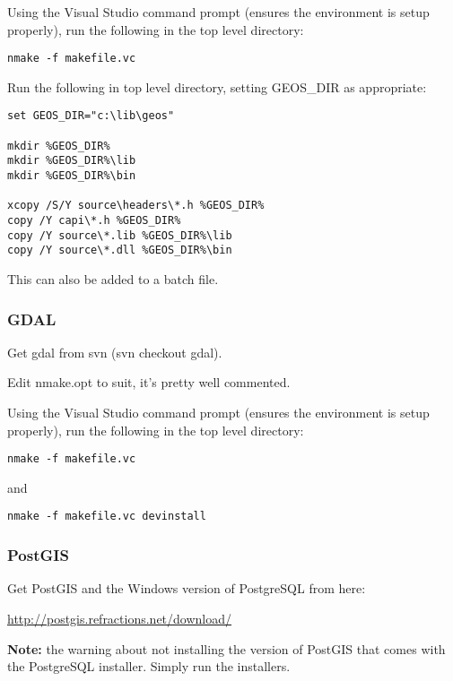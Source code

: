 Using the Visual Studio command prompt (ensures the environment is setup properly), run the following in the top level directory:

\begin{verbatim}
nmake -f makefile.vc 
\end{verbatim}

Run the following in top level directory, setting GEOS\_DIR as appropriate:

\begin{verbatim}
set GEOS_DIR="c:\lib\geos"

mkdir %GEOS_DIR%
mkdir %GEOS_DIR%\lib
mkdir %GEOS_DIR%\bin

xcopy /S/Y source\headers\*.h %GEOS_DIR%
copy /Y capi\*.h %GEOS_DIR%
copy /Y source\*.lib %GEOS_DIR%\lib
copy /Y source\*.dll %GEOS_DIR%\bin
\end{verbatim}

This can also be added to a batch file.

\subsubsection{GDAL}
Get gdal from svn (svn checkout  gdal).

Edit nmake.opt to suit, it's pretty well commented.

Using the Visual Studio command prompt (ensures the environment is setup properly), run the following in the top level directory:

\begin{verbatim}
nmake -f makefile.vc 
\end{verbatim}

and

\begin{verbatim}
nmake -f makefile.vc devinstall 
\end{verbatim}

\subsubsection{PostGIS}
Get PostGIS and the Windows version of PostgreSQL from here:

\url{http://postgis.refractions.net/download/}

\textbf{Note:} the warning about not installing the version of PostGIS that comes with the PostgreSQL installer. Simply run the installers.

